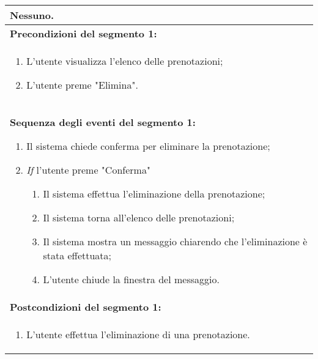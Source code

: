 \documentclass{article}
\begin{document}
\begin{table}[t]
\begin{tabular}{|p{\linewidth}|}
        Nessuno. \\
        \hline
        \cellcolor{gray!20}
        \textbf{Precondizioni del segmento 1:} \\
        \cellcolor{gray!20}
        \begin{minipage}{\linewidth}
            \begin{enumerate}[noitemsep]
                \item L'utente visualizza l'elenco delle prenotazioni;
                \item L'utente preme "Elimina".
            \end{enumerate}
        \end{minipage}
        \vspace{-5pt} \\
        \hline
        \textbf{Sequenza degli eventi del segmento 1:}
        \begin{enumerate}
            \item Il sistema chiede conferma per eliminare la prenotazione;
            \item \textit{If} l'utente preme "Conferma"
            \begin{enumerate}
                \item Il sistema effettua l'eliminazione della prenotazione;
                \item Il sistema torna all'elenco delle prenotazioni;
                \item Il sistema mostra un messaggio chiarendo che l'eliminazione è stata effettuata;
                \item L'utente chiude la finestra del messaggio.
            \end{enumerate}
        \end{enumerate} \\
        \hline
        \cellcolor{gray!20}
        \textbf{Postcondizioni del segmento 1:} \\
        \cellcolor{gray!20}
        \begin{minipage}{\linewidth}
            \begin{enumerate}[noitemsep]
                \item L'utente effettua l'eliminazione di una prenotazione.
            \end{enumerate}
        \end{minipage} \\
        \hline
    \end{tabular}
\end{table}
\end{document}
